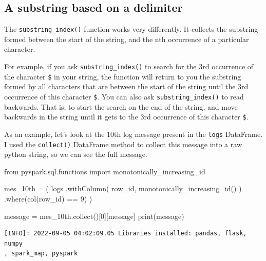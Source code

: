 \documentclass[
  11pt,
  letterpaper,
  DIV=11,
  numbers=noendperiod]{scrreprt}
\newenvironment{Shaded}{\begin{snugshade}}{\end{snugshade}}
\newcommand{\BuiltInTok}[1]{\textcolor[rgb]{0.00,0.23,0.31}{#1}}
\newcommand{\DecValTok}[1]{\textcolor[rgb]{0.68,0.00,0.00}{#1}}
\newcommand{\ImportTok}[1]{\textcolor[rgb]{0.00,0.46,0.62}{#1}}
\newcommand{\NormalTok}[1]{\textcolor[rgb]{0.00,0.23,0.31}{#1}}
\newcommand{\OperatorTok}[1]{\textcolor[rgb]{0.37,0.37,0.37}{#1}}
\newcommand{\StringTok}[1]{\textcolor[rgb]{0.13,0.47,0.30}{#1}}
\begin{document}
\hypertarget{a-substring-based-on-a-delimiter}{%
\subsection{A substring based on a
delimiter}\label{a-substring-based-on-a-delimiter}}

The \texttt{substring\_index()} function works very differently. It
collects the substring formed between the start of the string, and the
nth occurrence of a particular character.

For example, if you ask \texttt{substring\_index()} to search for the
3rd occurrence of the character \texttt{\$} in your string, the function
will return to you the substring formed by all characters that are
between the start of the string until the 3rd occurrence of this
character \texttt{\$}. You can also ask \texttt{substring\_index()} to
read backwards. That is, to start the search on the end of the string,
and move backwards in the string until it gets to the 3rd occurrence of
this character \texttt{\$}.

As an example, let's look at the 10th log message present in the
\texttt{logs} DataFrame. I used the \texttt{collect()} DataFrame method
to collect this message into a raw python string, so we can see the full
message.

\begin{Shaded}
\begin{Highlighting}[]
\ImportTok{from}\NormalTok{ pyspark.sql.functions }\ImportTok{import}\NormalTok{ monotonically\_increasing\_id}

\NormalTok{mes\_10th }\OperatorTok{=}\NormalTok{ (}
\NormalTok{    logs}
\NormalTok{    .withColumn(}
        \StringTok{\textquotesingle{}row\_id\textquotesingle{}}\NormalTok{,}
\NormalTok{        monotonically\_increasing\_id()}
\NormalTok{    )}
\NormalTok{    .where(col(}\StringTok{\textquotesingle{}row\_id\textquotesingle{}}\NormalTok{) }\OperatorTok{==} \DecValTok{9}\NormalTok{)}
\NormalTok{)}

\NormalTok{message }\OperatorTok{=}\NormalTok{ mes\_10th.collect()[}\DecValTok{0}\NormalTok{][}\StringTok{\textquotesingle{}message\textquotesingle{}}\NormalTok{]}
\BuiltInTok{print}\NormalTok{(message)}
\end{Highlighting}
\end{Shaded}

\begin{verbatim}
[INFO]: 2022-09-05 04:02:09.05 Libraries installed: pandas, flask, numpy
, spark_map, pyspark
\end{verbatim}
\end{document}
